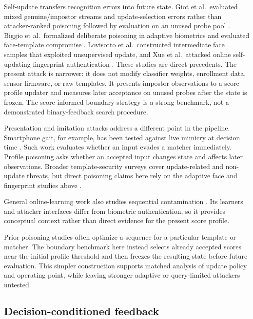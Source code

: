 \documentclass[technologies,article,submit,moreauthors]{Definitions/mdpi}
\begin{document}
Self-update transfers recognition errors into future state. Giot et al.~evaluated mixed genuine/impostor streams and update-selection errors rather than attacker-ranked poisoning followed by evaluation on an unused probe pool \cite{Giot2012HybridTemplateUpdate}. Biggio et al.~formalized deliberate poisoning in adaptive biometrics and evaluated face-template compromise \cite{Biggio2012PoisoningAdaptive,Biggio2013FacePoisoning}. Lovisotto et al.~constructed intermediate face samples that exploited unsupervised update, and Xue et al.~attacked online self-updating fingerprint authentication \cite{Lovisotto2020BiometricBackdoors,Xue2020LOPA}. These studies are direct precedents. The present attack is narrower: it does not modify classifier weights, enrollment data, sensor firmware, or raw templates. It presents impostor observations to a score-profile updater and measures later acceptance on unused probes after the state is frozen. The score-informed boundary strategy is a strong benchmark, not a demonstrated binary-feedback search procedure.

Presentation and imitation attacks address a different point in the pipeline. Smartphone gait, for example, has been tested against live mimicry at decision time \cite{Muaaz2017GaitImitation}. Such work evaluates whether an input evades a matcher immediately. Profile poisoning asks whether an accepted input changes state and affects later observations. Broader template-security surveys cover update-related and non-update threats, but direct poisoning claims here rely on the adaptive face and fingerprint studies above \cite{Baaqeel2022AdaptiveSpoofingSurvey,Abdullahi2024TemplateAttacks}.

General online-learning work also studies sequential contamination \cite{Zhang2020OnlinePoisoning}. Its learners and attacker interfaces differ from biometric authentication, so it provides conceptual context rather than direct evidence for the present score profile.

Prior poisoning studies often optimize a sequence for a particular template or matcher. The boundary benchmark here instead selects already accepted scores near the initial profile threshold and then freezes the resulting state before future evaluation. This simpler construction supports matched analysis of update policy and operating point, while leaving stronger adaptive or query-limited attackers untested.

\subsection{Decision-conditioned feedback}\label{sec:decision-conditioned-feedback}
\end{document}
